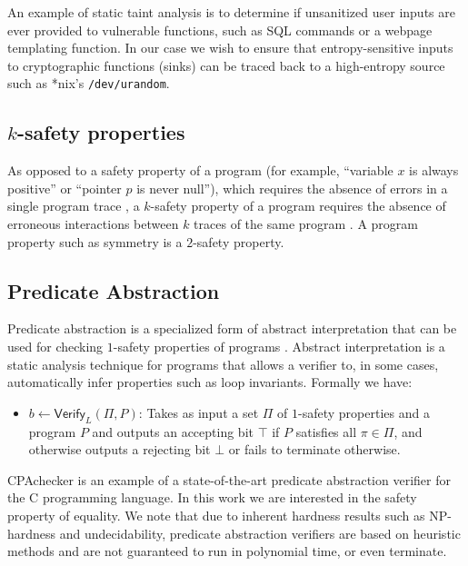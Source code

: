 \documentclass[letterpaper,twocolumn,10pt]{article}
\begin{document}
An example of static taint analysis is to determine if unsanitized user inputs are ever provided to vulnerable functions, such as SQL commands or
a webpage templating function. In our case we wish to ensure that entropy-sensitive inputs to cryptographic functions (sinks) can be
traced back to a high-entropy source such as *nix's \texttt{/dev/urandom}.

\subsection{$k$-safety properties}

As opposed to a safety property of a program (for example, ``variable $x$ is always positive'' or ``pointer $p$ is never null''), which requires
the absence of errors in a single program trace \cite{alpern1987recognizing}, a $k$-safety property of a program requires the absence of erroneous interactions between $k$
traces of the same program \cite{sousa2016cartesian}. A program property such as symmetry is a $2$-safety property.


\subsection{Predicate Abstraction}
\label{sec:predabstraction}

Predicate abstraction is a specialized form of abstract interpretation that can be used for checking $1$-safety properties of programs
\cite{flanagan2002predicate}. Abstract interpretation is a static analysis technique for programs that allows a verifier to, in some cases, 
automatically infer properties such as loop invariants. Formally we have:

\begin{itemize}
    \item $b \gets \mathsf{Verify}_{L}(\Pi, P)$: Takes as input a set $\Pi$ of $1$-safety properties and a program $P$ and outputs an accepting bit $\top$ if
    $P$ satisfies all $\pi \in \Pi$, and otherwise outputs a rejecting bit $\bot$ or fails to terminate otherwise.
\end{itemize}

CPAchecker \cite{beyer2011cpachecker} is an example of a state-of-the-art predicate abstraction verifier for the C programming language. In this work
we are interested in the safety property of equality. We note that due to inherent hardness results such as NP-hardness and undecidability, predicate
abstraction verifiers are based on heuristic methods and are not guaranteed to run in polynomial time, or even terminate.
\end{document}
